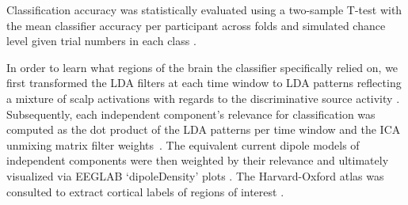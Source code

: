 Classification accuracy was statistically evaluated using a two-sample T-test with the mean classifier accuracy per participant across folds and simulated chance level given trial numbers in each class \cite{Muller-Putz2007-oc}.

In order to learn what regions of the brain the classifier specifically relied on, we first transformed the LDA filters at each time window to LDA patterns reflecting a mixture of scalp activations with regards to the discriminative source activity \cite{Haufe2014-do}. Subsequently, each independent component's relevance for classification was computed as the dot product of the LDA patterns per time window and the ICA unmixing matrix filter weights~\cite{Zander2016-ed}. The equivalent current dipole models of independent components were then weighted by their relevance and ultimately visualized via EEGLAB `dipoleDensity' plots \cite{Krol2018-cw}. The Harvard-Oxford atlas was consulted to extract cortical labels of regions of interest \cite{Makris2006-kp}.






